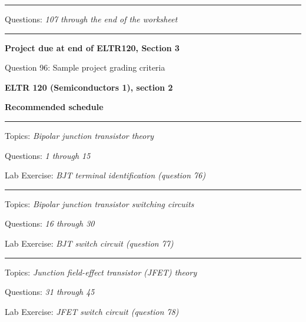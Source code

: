 \vskip 10pt
\hrule \vskip 5pt
\noindent
{}

\hskip 10pt Questions: {\it 107 through the end of the worksheet}
 
\vskip 10pt
\hrule \vskip 5pt
\noindent
{}

\hskip 10pt {\bf Project due at end of ELTR120, Section 3}
 
\hskip 10pt Question 96: Sample project grading criteria
 
\vskip 10pt











\vfil \eject

\centerline{\bf ELTR 120 (Semiconductors 1), section 2} \bigskip 
 
\vskip 10pt

\noindent
{\bf Recommended schedule}

\vskip 5pt

\hrule \vskip 5pt
\noindent
{}

\hskip 10pt Topics: {\it Bipolar junction transistor theory}
 
\hskip 10pt Questions: {\it 1 through 15}
 
\hskip 10pt Lab Exercise: {\it BJT terminal identification (question 76)}
 

\vskip 10pt
\hrule \vskip 5pt
\noindent
{}

\hskip 10pt Topics: {\it Bipolar junction transistor switching circuits}
 
\hskip 10pt Questions: {\it 16 through 30}
 
\hskip 10pt Lab Exercise: {\it BJT switch circuit (question 77)}
 
\vskip 10pt
\hrule \vskip 5pt
\noindent
{}

\hskip 10pt Topics: {\it Junction field-effect transistor (JFET) theory}
 
\hskip 10pt Questions: {\it 31 through 45}
 
\hskip 10pt Lab Exercise: {\it JFET switch circuit (question 78)}
 
